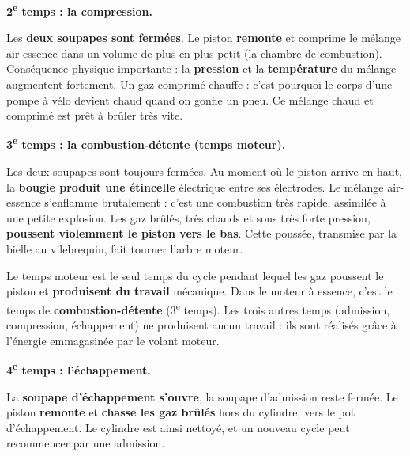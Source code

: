 \documentclass[11pt]{article}
\newcommand{\cle}[1]{{\popxbold\color{popdark}#1}}
\begin{document}
\textbf{2\textsuperscript{e} temps : la compression.}\par
Les \textbf{deux soupapes sont fermées}. Le piston \textbf{remonte} et comprime le mélange air-essence dans un volume de plus en plus petit (la chambre de combustion). Conséquence physique importante : la \textbf{pression} et la \textbf{température} du mélange augmentent fortement. Un gaz comprimé chauffe : c'est pourquoi le corps d'une pompe à vélo devient chaud quand on gonfle un pneu. Ce mélange chaud et comprimé est prêt à brûler très vite.

\textbf{3\textsuperscript{e} temps : la combustion-détente (temps moteur).}\par
Les deux soupapes sont toujours fermées. Au moment où le piston arrive en haut, la \textbf{bougie produit une étincelle} électrique entre ses électrodes. Le mélange air-essence s'enflamme brutalement : c'est une combustion très rapide, assimilée à une petite explosion. Les gaz brûlés, très chauds et sous très forte pression, \textbf{poussent violemment le piston vers le bas}. Cette poussée, transmise par la bielle au vilebrequin, fait tourner l'arbre moteur.

\begin{definition}
Le \cle{temps moteur} est le seul temps du cycle pendant lequel les gaz poussent le piston et \textbf{produisent du travail} mécanique. Dans le moteur à essence, c'est le temps de \textbf{combustion-détente} (3\textsuperscript{e} temps). Les trois autres temps (admission, compression, échappement) ne produisent aucun travail : ils sont réalisés grâce à l'énergie emmagasinée par le volant moteur.
\end{definition}

\textbf{4\textsuperscript{e} temps : l'échappement.}\par
La \textbf{soupape d'échappement s'ouvre}, la soupape d'admission reste fermée. Le piston \textbf{remonte} et \textbf{chasse les gaz brûlés} hors du cylindre, vers le pot d'échappement. Le cylindre est ainsi nettoyé, et un nouveau cycle peut recommencer par une admission.
\end{document}
